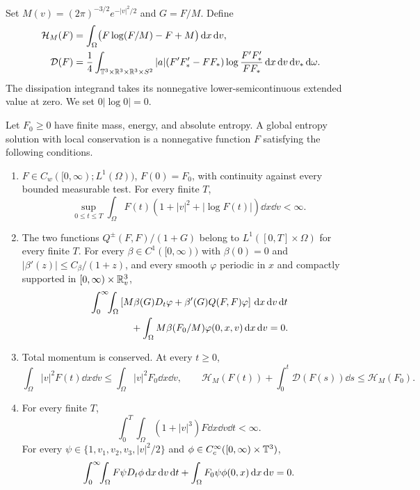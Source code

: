 Set \(M(v)=(2\pi)^{-3/2}e^{-|v|^2/2}\) and \(G=F/M\). Define
\begin{equation}\label{eq:entropy}
\begin{split}
 \mathcal H_M(F)&=\int_\Omega
       \bigl(F\log(F/M)-F+M\bigr)\,\mathrm d x\,\mathrm d v,\\
 \mathcal D(F)&=\frac14\int_{\mathbb T^3\times\mathbb R^3\times\mathbb R^3\times S^2}
 |a|(F'F_*'-FF_*)\log\frac{F'F_*'}{FF_*}
       \,\mathrm d x\,\mathrm d v\,\mathrm d v_*\,\mathrm d\omega.
\end{split}
\end{equation}
The dissipation integrand takes its nonnegative lower-semicontinuous
extended value at zero. We set \(0|\log0|=0\).

\begin{definition}
\label{def:admissible}
Let \(F_0\ge0\) have finite mass, energy, and absolute entropy.
A global entropy solution with local conservation is a nonnegative
function \(F\) satisfying the following conditions.
\begin{enumerate}[label=\textup{(\roman*)}]
\item \(F\in C_w([0,\infty);L^1(\Omega))\), \(F(0)=F_0\), with
continuity against every bounded measurable test. For every finite \(T\),
\[
 \sup_{0\le t\le T}\int_\Omega
 F(t)(1+|v|^2+|\log F(t)|)\dd x\dd v<\infty.
\]
\item The two functions \(Q^\pm(F,F)/(1+G)\) belong to
\(L^1([0,T]\times\Omega)\) for every finite \(T\).
For every \(\beta\in C^1([0,\infty))\) with \(\beta(0)=0\) and
\(|\beta'(z)|\le C_\beta/(1+z)\), and every smooth \(\varphi\) periodic
in \(x\) and compactly supported in \([0,\infty)\times\mathbb R^3_v\),
\begin{equation}\label{eq:renormalized}
\begin{split}
 &\int_0^\infty\!\!\int_\Omega
 \left[M\beta(G)\D\varphi+\beta'(G)Q(F,F)\varphi\right]
                  \dd x\dd v\dd t\\
 &\hspace{15mm}
 +\int_\Omega M\beta(F_0/M)\varphi(0,x,v)\dd x\dd v=0.
\end{split}
\end{equation}
\item Total momentum is conserved. At every \(t\ge0\),
\[
 \int_\Omega |v|^2F(t)\dd x\dd v\le\int_\Omega |v|^2F_0\dd x\dd v,
 \qquad
 \mathcal H_M(F(t))+\int_0^t\mathcal D(F(s))\dd s
      \le\mathcal H_M(F_0).
\]
\item For every finite \(T\),
\[
 \int_0^T\!\!\int_\Omega (1+|v|^3)F\dd x\dd v\dd t<\infty.
\]
For every \(\psi\in\{1,v_1,v_2,v_3,|v|^2/2\}\) and
\(\phi\in C_c^\infty([0,\infty)\times\mathbb T^3)\),
\begin{equation}\label{eq:local-balances}
 \int_0^\infty\!\!\int_\Omega F\psi D_t\phi\,\mathrm d x\,\mathrm d v\,\mathrm d t
   +\int_\Omega F_0\psi\phi(0,x)\,\mathrm d x\,\mathrm d v=0.
\end{equation}
\end{enumerate}
\end{definition}


